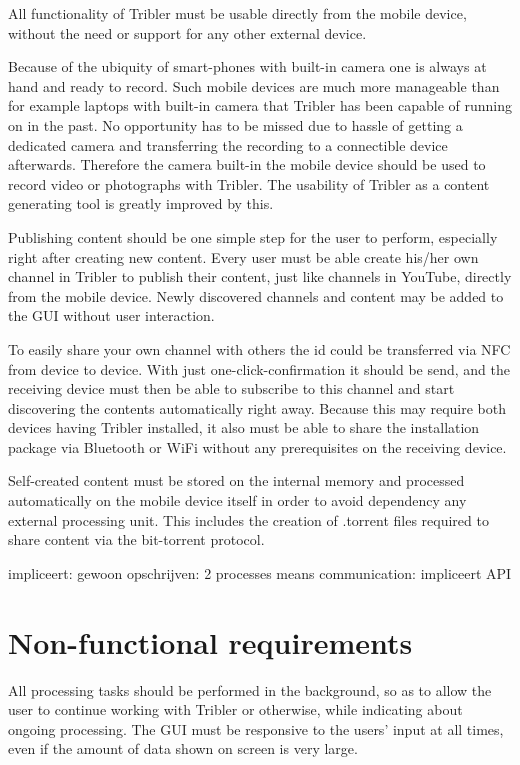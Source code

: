 All functionality of Tribler must be usable directly from the mobile device, without the need or support for any other external device.

Because of the ubiquity of smart-phones with built-in camera one is always at hand and ready to record.
Such mobile devices are much more manageable than for example laptops with built-in camera that Tribler has been capable of running on in the past.
No opportunity has to be missed due to hassle of getting a dedicated camera and transferring the recording to a connectible device afterwards.
Therefore the camera built-in the mobile device should be used to record video or photographs with Tribler.
The usability of Tribler as a content generating tool is greatly improved by this. 

Publishing content should be one simple step for the user to perform, especially right after creating new content.
Every user must be able create his/her own channel in Tribler to publish their content, just like channels in YouTube, directly from the mobile device.
Newly discovered channels and content may be added to the GUI without user interaction.

To easily share your own channel with others the id could be transferred via NFC from device to device.
With just one-click-confirmation it should be send, and the receiving device must then be able to subscribe to this channel and start discovering the contents automatically right away.
Because this may require both devices having Tribler installed, it also must be able to share the installation package via Bluetooth or WiFi without any prerequisites on the receiving device.

Self-created content must be stored on the internal memory and processed automatically on the mobile device itself in order to avoid dependency any external processing unit.
This includes the creation of .torrent files required to share content via the bit-torrent protocol.



impliceert: gewoon opschrijven: 2 processes means communication: impliceert API




\section{Non-functional requirements}

All processing tasks should be performed in the background, so as to allow the user to continue working with Tribler or otherwise, while indicating about ongoing processing.
The GUI must be responsive to the users' input at all times, even if the amount of data shown on screen is very large.

